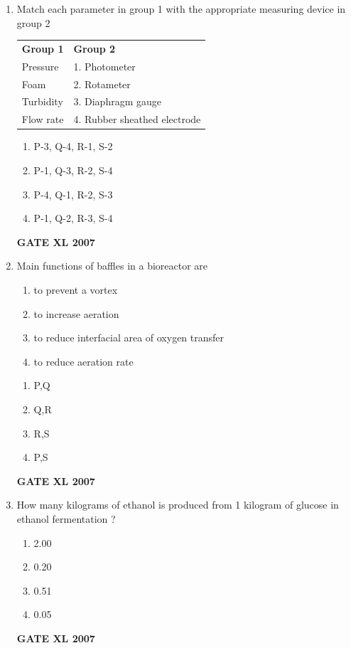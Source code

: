 \documentclass[journal,12pt,onecolumn]{IEEEtran}
\begin{document}
\begin{enumerate}
    \item Match each parameter in group 1 with the appropriate measuring device in group 2
    
    
    \begin{tabularx}{\textwidth}{@{}lX@{}}
	    \textbf{Group 1} & \textbf{Group 2}\\
     Pressure & 1. Photometer\\
     Foam & 2. Rotameter\\
     Turbidity & 3. Diaphragm gauge\\
     Flow rate & 4. Rubber sheathed electrode\\
    \end{tabularx}
    \begin{enumerate}
        \item P-3, Q-4, R-1, S-2
        \item P-1, Q-3, R-2, S-4
        \item P-4, Q-1, R-2, S-3
        \item P-1, Q-2, R-3, S-4
    \end{enumerate}
	    \hfill \textbf{GATE XL 2007}

    \item Main functions of baffles in a bioreactor are
    \begin{enumerate}
        \item to prevent a vortex
        \item to increase aeration
        \item to reduce interfacial area of oxygen transfer
        \item to reduce aeration rate
    \end{enumerate}
    \begin{enumerate}
        \item P,Q
        \item Q,R
        \item R,S
        \item P,S
    \end{enumerate}
	    \hfill \textbf{GATE XL 2007}
    
    \item How many kilograms of ethanol is produced from 1 kilogram of glucose in ethanol fermentation ?
    \begin{enumerate}
        \item 2.00
        \item 0.20
        \item 0.51
        \item 0.05
    \end{enumerate}
	    \hfill \textbf{GATE XL 2007}
    

\end{enumerate}
\end{document}

